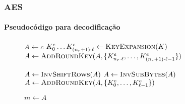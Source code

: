 \documentclass[12pt]{beamer}
\begin{document}
\begin{frame}
    \footnotesize
    \frametitle{AES}
    \framesubtitle{Pseudocódigo para decodificação}
        \begin{figure}[ht]
      \centering
      \begin{minipage}{.7\linewidth}
        \begin{algorithm}[H]
        
            $A \leftarrow c$\;
            $K^{e}_{0} \dots K^{e}_{(n_r + 1) \cdot \ell}
                \leftarrow \textsc{KeyExpansion}(K)$\;
            $A \leftarrow \textsc{AddRoundKey}(A,
                \{K^{e}_{n_r \cdot \ell}, \dots, K^{e}_{(n_r + 1) \cdot \ell - 1}\})$\;
            
         
            $A \leftarrow \textsc{InvShiftRows}(A)$\;
            $A \leftarrow \textsc{InvSubBytes}(A)$\;
            $A \leftarrow \textsc{AddRoundKey}(A,
                \{K^{e}_{0}, \dots, K^{e}_{\ell - 1}\})$\;
        
            $m \leftarrow A$\;
        \end{algorithm}
      \end{minipage}
    \end{figure}
\end{frame}
\end{document}
